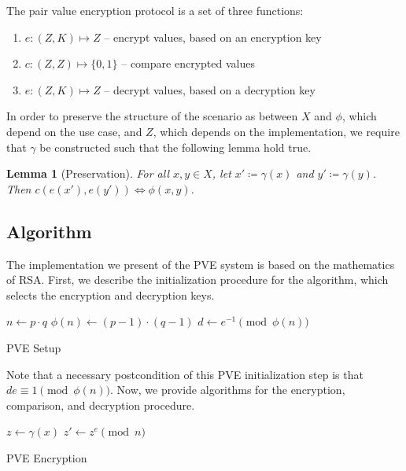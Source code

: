 \documentclass{article}
\newtheorem{lemma}[theorem]{Lemma}
\begin{document}
The pair value encryption protocol is a set of three functions:

\begin{enumerate}
    \item $e: (Z,K) \mapsto Z$ – encrypt values, based on an encryption key
    \item $c: (Z,Z) \mapsto \{0,1\}$ – compare encrypted values
    \item $e: (Z,K) \mapsto Z$ – decrypt values, based on a decryption key
\end{enumerate}

In order to preserve the structure of the scenario as between $X$ and $\phi$, which depend on the use case, and $Z$, which depends on the implementation, we require that $\gamma$ be constructed such that the following lemma hold true.

\begin{lemma}[Preservation]
    For all $x,y\in X$, let $x' \coloneqq \gamma(x)$ and $y' \coloneqq \gamma(y)$. Then $c(e(x'), e(y')) \iff \phi(x,y)$.
\end{lemma}

\subsection{Algorithm}

The implementation we present of the PVE system is based on the mathematics of RSA. First, we describe the initialization procedure for the algorithm, which selects the encryption and decryption keys.


\begin{algorithm}[H]
\SetAlgoLined
{}
    $n \leftarrow p \cdot q$\;
    $\phi(n) \leftarrow (p - 1) \cdot (q - 1)$\;
    $d \leftarrow e^{-1} \pmod{\phi(n)}$\;
 \caption{PVE Setup}
\end{algorithm}

Note that a necessary postcondition of this PVE initialization step is that $de \equiv 1 \pmod{\phi(n)}$. Now, we provide algorithms for the encryption, comparison, and decryption procedure.

\begin{algorithm}[H]
\SetAlgoLined
{}
    $z \leftarrow \gamma(x)$\;
    $z' \leftarrow z^e \pmod{n}$\;
 \caption{PVE Encryption}
\end{algorithm}
\end{document}
